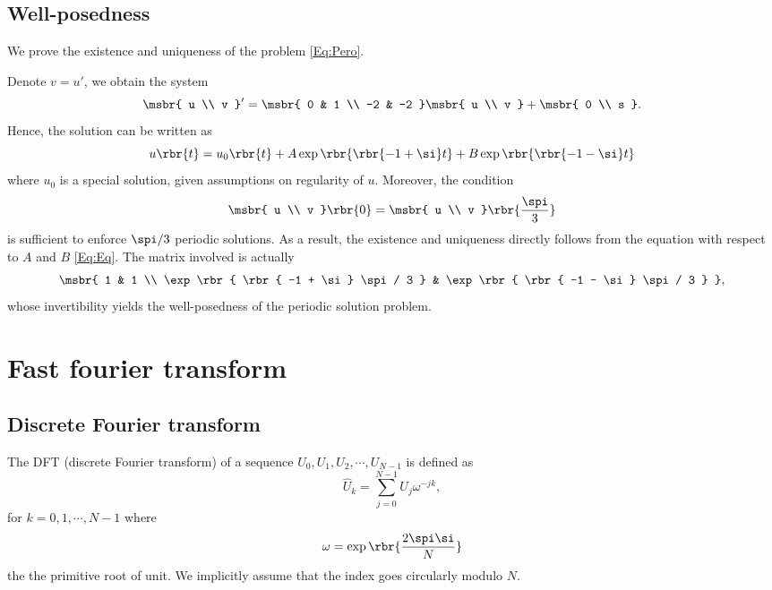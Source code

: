 \documentclass[english, nochinese]{pnote}
\begin{document}
\subsection{Well-posedness}

We prove the existence and uniqueness of the problem  \eqref{Eq:Pero}.

Denote $ v = u' $, we obtain the system
\begin{equation}
\msbr{ u \\ v }' = \msbr{ 0 & 1 \\ -2 & -2 } \msbr{ u \\ v } + \msbr{ 0 \\ s }.
\end{equation}
Hence, the solution can be written as
\begin{equation}
u \rbr{t} = u_0 \rbr{t} + A \exp \rbr{ \rbr{ -1 + \si } t } + B \exp \rbr{ \rbr{ -1 - \si } t }
\end{equation}
where $u_0$ is a special solution, given assumptions on regularity of $u$.
Moreover, the condition
\begin{equation} \label{Eq:Eq}
\msbr{ u \\ v } \rbr{0} = \msbr{ u \\ v } \rbr{\frac{\spi}{3}}
\end{equation}
is sufficient to enforce $ \spi / 3 $ periodic solutions. As a result, the existence and uniqueness directly follows from the equation with respect to $A$ and $B$ \eqref{Eq:Eq}. The matrix involved is actually
\begin{equation}
\msbr{ 1 & 1 \\ \exp \rbr{ \rbr{ -1 + \si } \spi / 3 } & \exp \rbr{ \rbr{ -1 - \si } \spi / 3 } },
\end{equation}
whose invertibility yields the well-posedness of the periodic solution problem.

\section{Fast fourier transform}

\subsection{Discrete Fourier transform}

The DFT (discrete Fourier transform) of a sequence $ U_0, U_1, U_2, \cdots, U_{ N - 1 } $ is defined as
\begin{equation}
\hat{U}_k = \sum_{ j = 0 }^{ N - 1 } U_j \omega^{ -j k },
\end{equation}
for $ k = 0, 1, \cdots, N - 1 $ where
\begin{equation}
\omega = \exp \rbr{ \frac{ 2 \spi \si }{N} }
\end{equation}
the the primitive root of unit. We implicitly assume that the index goes circularly modulo $N$.
\end{document}

